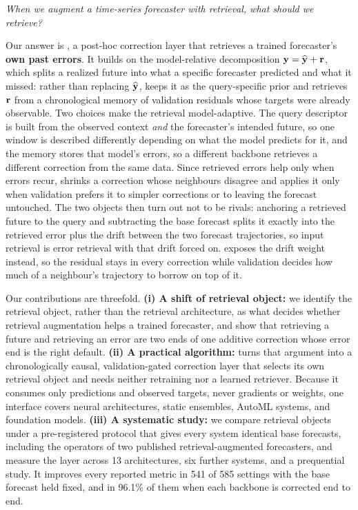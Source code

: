 {\em When we augment a time-series forecaster with retrieval, what should we
retrieve?}

Our answer is \method{}, a post-hoc correction layer that retrieves a trained
forecaster's \textbf{own past errors}. It builds on the model-relative
decomposition $\mathbf{y} = \widehat{\mathbf{y}} + \mathbf{r}$, which splits a realized future into what
a specific forecaster predicted and what it missed: rather than replacing $\widehat{\mathbf{y}}$,
\method{} keeps it as the query-specific prior and retrieves $\mathbf{r}$ from a
chronological memory of validation residuals whose targets were already observable.
Two choices make the retrieval model-adaptive. The query descriptor is built from
the observed context \emph{and} the forecaster's intended future, so one window is
described differently depending on what the model predicts for it, and the memory
stores that model's errors, so a different backbone retrieves a different
correction from the same data. Since retrieved errors help only when errors recur,
\method{} shrinks a correction whose neighbours disagree and applies it only when
validation prefers it to simpler corrections or to leaving the forecast untouched.
The two objects then turn out not to be rivals: anchoring a retrieved future to the
query and subtracting the base forecast splits it exactly into the retrieved error
plus the drift between the two forecast trajectories, so input retrieval is error
retrieval with that drift forced on. \method{} exposes the drift weight instead, so
the residual stays in every correction while validation decides how much of a
neighbour's trajectory to borrow on top of it.

Our contributions are threefold.
\textbf{(i) A shift of retrieval object:} we identify the retrieval object, rather
than the retrieval architecture, as what decides whether retrieval augmentation
helps a trained forecaster, and show that retrieving a future and retrieving an
error are two ends of one additive correction whose error end is the right default.
\textbf{(ii) A practical algorithm:} \method{} turns that argument into a
chronologically causal, validation-gated correction layer that selects its own
retrieval object and needs neither retraining nor a learned retriever. Because it
consumes only predictions and observed targets, never gradients or weights, one
interface covers neural architectures, static ensembles, AutoML systems, and
foundation models.
\textbf{(iii) A systematic study:} we compare retrieval objects under a
pre-registered protocol that gives every system identical base forecasts, including
the operators of two published retrieval-augmented forecasters, and measure the
layer across 13 architectures, six further systems, and a prequential study. It
improves every reported metric in 541 of 585 settings with the base forecast held
fixed, and in 96.1\% of them when each backbone is corrected end to end.
